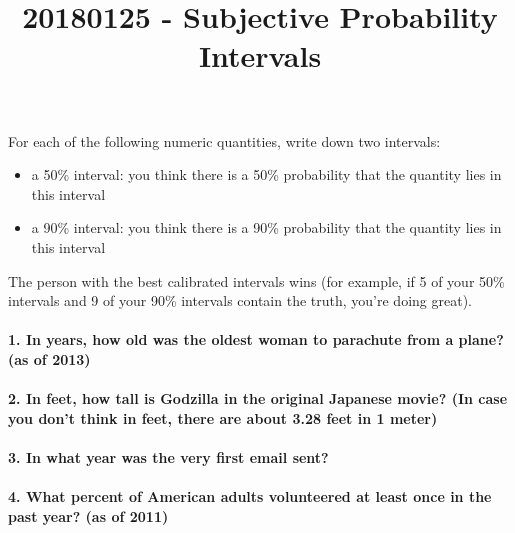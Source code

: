 \documentclass[]{article}
\title{20180125 - Subjective Probability Intervals}
\author{}
\date{}
\providecommand{\tightlist}{%
  \setlength{\itemsep}{0pt}\setlength{\parskip}{0pt}}
\let\oldparagraph\paragraph
\renewcommand{\paragraph}[1]{\oldparagraph{#1}\mbox{}}
\begin{document}
\maketitle

For each of the following numeric quantities, write down two intervals:

\begin{itemize}
\tightlist
\item
  a 50\% interval: you think there is a 50\% probability that the
  quantity lies in this interval
\item
  a 90\% interval: you think there is a 90\% probability that the
  quantity lies in this interval
\end{itemize}

The person with the best calibrated intervals wins (for example, if 5 of
your 50\% intervals and 9 of your 90\% intervals contain the truth,
you're doing great).

\paragraph{1. In years, how old was the oldest woman to parachute from a
plane? (as of
2013)}\label{in-years-how-old-was-the-oldest-woman-to-parachute-from-a-plane-as-of-2013}

\vspace{0.75cm}

\paragraph{2. In feet, how tall is Godzilla in the original Japanese
movie? (In case you don't think in feet, there are about 3.28 feet in 1
meter)}\label{in-feet-how-tall-is-godzilla-in-the-original-japanese-movie-in-case-you-dont-think-in-feet-there-are-about-3.28-feet-in-1-meter}

\vspace{0.75cm}

\paragraph{3. In what year was the very first email
sent?}\label{in-what-year-was-the-very-first-email-sent}

\vspace{0.75cm}

\paragraph{4. What percent of American adults volunteered at least once
in the past year? (as of
2011)}\label{what-percent-of-american-adults-volunteered-at-least-once-in-the-past-year-as-of-2011}
\end{document}
